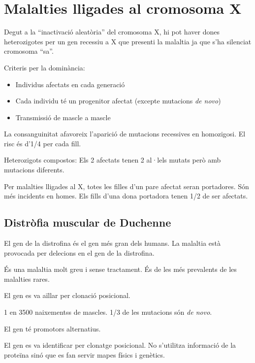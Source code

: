 \section{Malalties lligades al cromosoma X}
\label{sec:malalt-llig-al}

Degut a la ``inactivació aleatòria'' del cromosoma X, hi pot haver dones
heterozigotes per un gen recessiu a X que presenti la malaltia ja que
s'ha silenciat cromosoma ``sa''.

Criteris per la dominància:
\begin{itemize}
\item Individus afectats en cada generació
\item Cada individu té un progenitor afectat (excepte mutacions
  \textit{de novo})
\item Transmissió de mascle a mascle
\end{itemize}

La consanguinitat afavoreix l'aparició de mutacions recessives en
homozigosi. El risc és d'1/4 per cada fill.

Heterozigots compostos: Els 2 afectats tenen 2 al·lels mutats però amb
mutacions diferents.

Per malalties lligades al X, totes les filles d'un pare afectat seran
portadores. Són més incidents en homes. Els fills d'una dona portadora
tenen 1/2 de ser afectats.

\subsection{Distròfia muscular de Duchenne}
\label{sec:distr-musc-de}
El gen de la distrofina és el gen més gran dels humans. La malaltia
està provocada per delecions en el gen de la distrofina.

És una malaltia molt greu i sense tractament. És de les més prevalents
de les malalties rares.

El gen es va aïllar per clonació posicional.


1 en 3500 naixementss de mascles. 1/3 de les mutacions són \textit{de novo}.

El gen té promotors alternatius.

El gen es va identificar per clonatge posicional. No s'utilitza informació de la proteïna sinó que es fan servir mapes físics i genètics.

